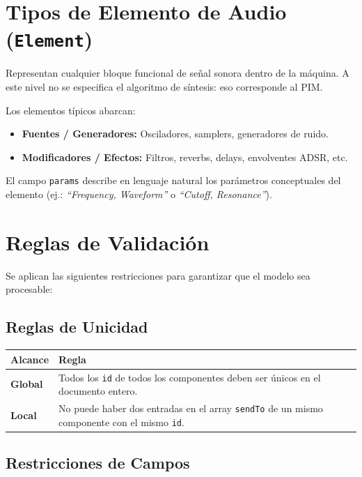 \section{Tipos de Elemento de Audio (\texttt{Element})}

Representan cualquier bloque funcional de señal sonora dentro de la máquina. A este nivel no se especifica el algoritmo de síntesis: eso corresponde al PIM.

Los elementos típicos abarcan:
\begin{itemize}
    \item \textbf{Fuentes / Generadores:} Osciladores, samplers, generadores de ruido.
    \item \textbf{Modificadores / Efectos:} Filtros, reverbs, delays, envolventes ADSR, etc.
\end{itemize}

El campo \texttt{params} describe en lenguaje natural los parámetros conceptuales del elemento (ej.: \textit{``Frequency, Waveform''} o \textit{``Cutoff, Resonance''}).

\section{Reglas de Validación}

Se aplican las siguientes restricciones para garantizar que el modelo sea procesable:

\subsection{Reglas de Unicidad}

\begin{table}[H]
\centering
\small
\begin{tabular}{@{}lp{10cm}@{}}
\toprule
Alcance & Regla \\ \midrule
\textbf{Global} & Todos los \texttt{id} de todos los componentes deben ser únicos en el documento entero. \\
\textbf{Local} & No puede haber dos entradas en el array \texttt{sendTo} de un mismo componente con el mismo \texttt{id}. \\ \bottomrule
\end{tabular}
\end{table}

\subsection{Restricciones de Campos}

